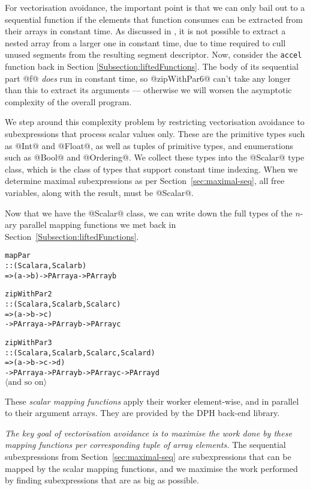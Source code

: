 For vectorisation avoidance, the important point is that we can only bail out to a sequential function if the elements that function consumes can be extracted from their arrays in constant time. As discussed in \cite{lippmeier:work-efficient}, it is not possible to extract a nested array from a larger one in constant time, due to time required to cull unused segments from the resulting segment descriptor. Now, consider the \texttt{accel} function back in Section \ref{Subsection:liftedFunctions}. The body of its sequential part @f@ \emph{does} run in constant time, so @zipWithPar6@ can't take any longer than this to extract its arguments --- otherwise we will worsen the asymptotic complexity of the overall program.

We step around this complexity problem by restricting vectorisation avoidance to subexpressions that process scalar values only. These are the primitive types such as @Int@ and @Float@, as well as tuples of primitive types, and enumerations such as @Bool@ and @Ordering@. We collect these types into the @Scalar@ type class, which is the class of types that support constant time indexing. When we determine  maximal subexpressions as per Section~\ref{sec:maximal-seq}, all free variables, along with the result, must be @Scalar@.

\eject
Now that we have the @Scalar@ class, we can write down the full types of the $n$-ary parallel mapping functions we met back in Section~\ref{Subsection:liftedFunctions}.
%
\begin{small}
\begin{alltt}
  mapPar
    :: (Scalar a, Scalar b)
    => (a -> b) -> PArray a -> PArray b

  zipWithPar2
    :: (Scalar a, Scalar b, Scalar c) 
    => (a -> b -> c) 
    -> PArray a -> PArray b -> PArray c

  zipWithPar3 
    :: (Scalar a, Scalar b, Scalar c, Scalar d) 
    => (a -> b -> c -> d) 
    -> PArray a -> PArray b -> PArray c -> PArray d
  \(\langle\textrm{and so on}\rangle\)
\end{alltt}
\end{small}
%
These \emph{scalar mapping functions} apply their worker \mbox{element-wise}, and in parallel to their argument arrays.  They are provided by the DPH back-end library.

\emph{The key goal of vectorisation avoidance is to maximise the work done by these mapping functions per corresponding tuple of array elements.} The sequential subexpressions from Section~\ref{sec:maximal-seq} are subexpressions that can be mapped by the scalar mapping functions, and we maximise the work performed by finding subexpressions that are as big as possible. 


